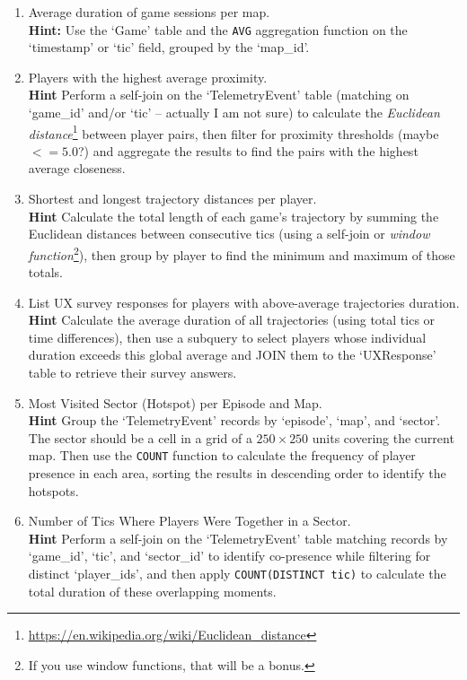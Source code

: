 \documentclass[11pt]{article}
\begin{document}
\begin{enumerate}
  \item Average duration of game sessions per map. \\
  \textbf{Hint:} Use the `Game' table and the \texttt{AVG} aggregation function on the `timestamp' or `tic' field, grouped by the `map\_id'.

  \item Players with the highest average proximity. \\
  \textbf{Hint} Perform a self-join on the `TelemetryEvent' table (matching on `game\_id' and/or `tic' -- actually I am not sure) to calculate the \textit{Euclidean distance}\footnote{\url{https://en.wikipedia.org/wiki/Euclidean_distance}} between player pairs, then filter for proximity thresholds (maybe $<= 5.0$?) and aggregate the results to find the pairs with the highest average closeness.

  \item Shortest and longest trajectory distances per player. \\
  \textbf{Hint} Calculate the total length of each game's trajectory by summing the Euclidean distances between consecutive tics (using a self-join or \textit{window function}\footnote{If you use window functions, that will be a bonus.}), then group by player to find the minimum and maximum of those totals.

  \item List UX survey responses for players with above-average trajectories duration. \\
  \textbf{Hint} Calculate the average duration of all trajectories (using total tics or time differences), then use a subquery to select players whose individual duration exceeds this global average and JOIN them to the `UXResponse' table to retrieve their survey answers.

  \item Most Visited Sector (Hotspot) per Episode and Map. \\
  \textbf{Hint} Group the `TelemetryEvent' records by `episode', `map', and `sector'.  The sector should be a cell in a grid of a $250 \times 250$ units covering the current map.  Then use the \texttt{COUNT} function to calculate the frequency of player presence in each area, sorting the results in descending order to identify the hotspots.

  \item Number of Tics Where Players Were Together in a Sector. \\
  \textbf{Hint} Perform a self-join on the `TelemetryEvent' table matching records by `game\_id', `tic', and `sector\_id' to identify co-presence while filtering for distinct `player\_ids', and then apply \texttt{COUNT(DISTINCT tic)} to calculate the total duration of these overlapping moments.


\end{enumerate}
\end{document}
